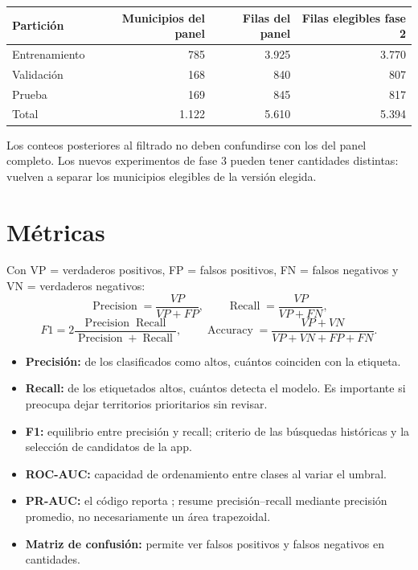 \documentclass[11pt,a4paper]{report}
\newcommand{\campo}[1]{\texttt{\detokenize{#1}}}
\begin{document}
\begin{center}
\begin{tabular}{@{}lrrr@{}}
\toprule
\textbf{Partición} & \textbf{Municipios del panel} & \textbf{Filas del panel} & \textbf{Filas elegibles fase 2}\\
\midrule
Entrenamiento & 785 & 3.925 & 3.770\\
Validación & 168 & 840 & 807\\
Prueba & 169 & 845 & 817\\
\midrule
Total & 1.122 & 5.610 & 5.394\\
\bottomrule
\end{tabular}
\end{center}
Los conteos posteriores al filtrado no deben confundirse con los del panel completo. Los nuevos experimentos de fase 3 pueden tener cantidades distintas: vuelven a separar los municipios elegibles de la versión elegida.

\section{Métricas}
Con VP = verdaderos positivos, FP = falsos positivos, FN = falsos negativos y VN = verdaderos negativos:
\[
\operatorname{Precision}=\frac{VP}{VP+FP},\qquad
\operatorname{Recall}=\frac{VP}{VP+FN},
\]
\[
F1=2\frac{\operatorname{Precision}\operatorname{Recall}}
{\operatorname{Precision}+\operatorname{Recall}},
\qquad
\operatorname{Accuracy}=\frac{VP+VN}{VP+VN+FP+FN}.
\]
\begin{itemize}
\item \textbf{Precisión:} de los clasificados como altos, cuántos coinciden con la etiqueta.
\item \textbf{Recall:} de los etiquetados altos, cuántos detecta el modelo. Es importante si preocupa dejar territorios prioritarios sin revisar.
\item \textbf{F1:} equilibrio entre precisión y recall; criterio de las búsquedas históricas y la selección de candidatos de la app.
\item \textbf{ROC-AUC:} capacidad de ordenamiento entre clases al variar el umbral.
\item \textbf{PR-AUC:} el código reporta \campo{average_precision_score}; resume precisión--recall mediante precisión promedio, no necesariamente un área trapezoidal.
\item \textbf{Matriz de confusión:} permite ver falsos positivos y falsos negativos en cantidades.
\end{itemize}
\end{document}
